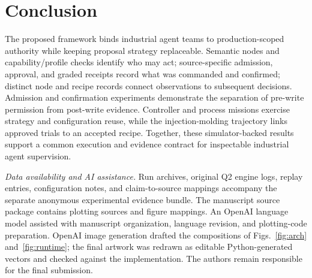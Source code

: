 \section{Conclusion}
\label{sec:conclusion}
The proposed framework binds industrial agent teams to production-scoped
authority while keeping proposal strategy replaceable. Semantic nodes and
capability/profile checks identify who may act; source-specific admission,
approval, and graded receipts record what was commanded and confirmed;
distinct node and recipe records connect observations to subsequent
decisions. Admission and confirmation experiments demonstrate the
separation of pre-write permission from post-write evidence. Controller and
process missions exercise strategy and configuration reuse, while the
injection-molding trajectory links approved trials to an accepted recipe.
Together, these simulator-backed results support a common execution and
evidence contract for inspectable industrial agent supervision.

\noindent\textit{Data availability and AI assistance.}
Run archives, original Q2 engine logs, replay entries, configuration notes,
and claim-to-source mappings accompany the separate anonymous experimental
evidence bundle. The manuscript source package contains plotting sources
and figure mappings. An OpenAI language model assisted
with manuscript organization, language revision, and plotting-code
preparation. OpenAI image generation drafted the compositions of
Figs.~\ref{fig:arch} and~\ref{fig:runtime}; the final artwork was redrawn
as editable Python-generated vectors and checked against the implementation.
The authors remain responsible for the final submission.
